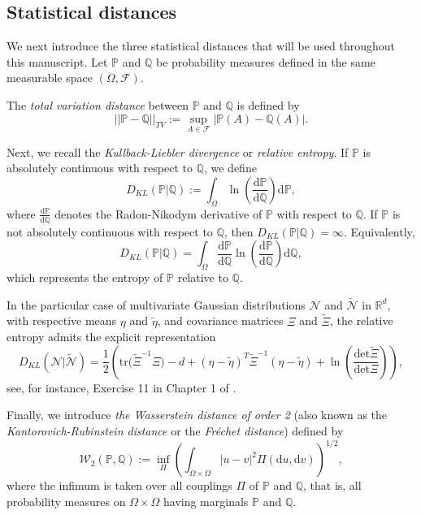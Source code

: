 \documentclass[12pt,thmsa]{article}
\newcommand{\ud}{\mathrm{d}}
\begin{document}
\subsection{Statistical distances}
We next introduce the three statistical distances that will be used throughout this manuscript. Let $\mathbb{P}$ and $\mathbb{Q}$ be probability measures  defined in the same measurable space $\left(\Omega,\mathcal{F}\right)$.

The {\it total variation distance} between $\mathbb{P}$ and $\mathbb{Q}$ is defined by 
$$||\mathbb{P}-\mathbb{Q}||_{TV}:=\sup\limits_{A\in \mathcal{F}}{|\mathbb{P}(A)-\mathbb{Q}(A)|}.$$ 

Next, we recall the {\it  Kullback-Liebler divergence} or {\it relative entropy}.   If $\mathbb{P}$ is absolutely continuous with respect to $\mathbb{Q}$, we define
\[
D_{KL}(\mathbb{P}|\mathbb{Q}):=\int_{\Omega} \ln\left(\frac{\ud \mathbb{P}}{\ud \mathbb{Q}}\right) \ud \mathbb{P},
\] 
where $\frac{\ud \mathbb{P}}{\ud \mathbb{Q}}$ denotes the Radon-Nikodym derivative of $\mathbb{P}$  with respect to $\mathbb{Q}$. If $\mathbb{P}$ is not absolutely continuous with respect to $\mathbb{Q}$, then $D_{KL}(\mathbb{P}|\mathbb{Q})=\infty$. Equivalently, 
\[
D_{KL}(\mathbb{P}|\mathbb{Q})=\int_{\Omega} \frac{\ud \mathbb{P}}{\ud \mathbb{Q}}\ln\left(\frac{\ud \mathbb{P}}{\ud \mathbb{Q}}\right) \ud \mathbb{Q},
\] 
which represents the entropy of $\mathbb{P}$ relative to $\mathbb{Q}$. 

In the particular case of multivariate Gaussian distributions $\mathcal{N}$ and $\widetilde{\mathcal{N}}$ in $\mathbb{R}^d$, with respective means $\eta$ and $\widetilde{\eta}$, and covariance matrices $\Xi$ and $\widetilde{\Xi}$, the relative entropy admits the  explicit representation
\begin{equation}\label{KLgaus}
D_{KL}(\mathcal{N}|\widetilde{\mathcal{N}})=\frac{1}{2}\left(\mathrm{tr}\Big(\widetilde{\Xi}^{-1}\Xi\Big)-d+(\eta- \widetilde{\eta})^{T}\widetilde{\Xi}^{-1}(\eta-\widetilde{\eta})+\ln\left(\frac{\mathrm{det}\widetilde{\Xi}}{\mathrm{det}\Xi}\right)\right),
\end{equation}
see, for instance, Exercise 11 in Chapter 1 of \cite{Par}.

Finally, we introduce  {\it the Wasserstein distance of order 2} (also known as the  {\it Kantorovich-Rubinstein distance} or the {\it Fr\'echet distance}) defined by 
\begin{equation}\label{def:wasserstein}
\mathcal{W}_2(\mathbb{P},\mathbb{Q}):=
\inf_{\Pi} \left(\int_{\Omega\times \Omega}|u-v|^2\Pi(\ud u,\ud v)\right)^{1/2},
\end{equation}
where the infimum is taken over all couplings $\Pi$ of  $\mathbb{P}$ and $\mathbb{Q}$, that is, all probability measures on $\Omega\times \Omega$ having marginals $\mathbb{P}$ and $\mathbb{Q}$.
\end{document}
